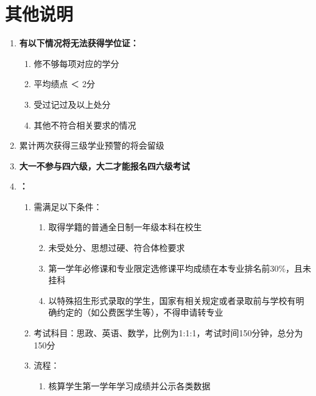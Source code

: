 \section[其他说明]{其他说明}
\begin{enumerate}
    \item \textbf{有以下情况将无法获得学位证：}
          \begin{enumerate}
              \item 修不够每项对应的学分
              \item 平均绩点 ＜ 2分
              \item 受过记过及以上处分
              \item 其他不符合相关要求的情况
          \end{enumerate}
    \item 累计两次获得三级学业预警的将会留级
    \item \textbf{大一不参与四六级，大二才能报名四六级考试}
    \item \textbf{\footnotemark：}
          \begin{enumerate}
              \item 需满足以下条件：
                    \begin{enumerate}
                        \item 取得学籍的普通全日制一年级本科在校生
                        \item 未受处分、思想过硬、符合体检要求
                        \item 第一学年必修课和专业限定选修课平均成绩在本专业排名前30\%，且未挂科
                        \item 以特殊招生形式录取的学生，国家有相关规定或者录取前与学校有明确约定的（如公费医学生等），不得申请转专业
                    \end{enumerate}
              \item 考试科目：思政、英语\footnotemark、数学，比例为1:1:1，考试时间150分钟，总分为150分
              \item 流程：
                    \begin{enumerate}
                        \item 核算学生第一学年学习成绩并公示各类数据

\end{enumerate}
\end{enumerate}
\end{enumerate}
